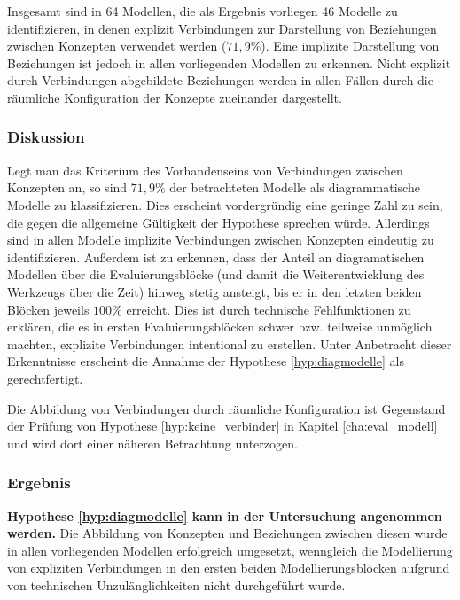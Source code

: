 Insgesamt sind in 64 Modellen, die als Ergebnis vorliegen 46 Modelle zu identifizieren, in denen explizit Verbindungen zur Darstellung von Beziehungen zwischen Konzepten verwendet werden ($71,9\%$). Eine implizite Darstellung von Beziehungen ist jedoch in allen vorliegenden Modellen zu erkennen. Nicht explizit durch Verbindungen abgebildete Beziehungen werden in allen Fällen durch die räumliche Konfiguration der Konzepte zueinander dargestellt.

\subsubsection{Diskussion} %

Legt man das Kriterium des Vorhandenseins von Verbindungen zwischen Konzepten an, so sind $71,9\%$ der betrachteten Modelle als diagrammatische Modelle zu klassifizieren. Dies erscheint vordergründig eine geringe Zahl zu sein, die gegen die allgemeine Gültigkeit der Hypothese sprechen würde. Allerdings sind in allen Modelle implizite Verbindungen zwischen Konzepten eindeutig zu identifizieren. Außerdem ist zu erkennen, dass der Anteil an diagramatischen Modellen über die Evaluierungsblöcke (und damit die Weiterentwicklung des Werkzeugs über die Zeit) hinweg stetig ansteigt, bis er in den letzten beiden Blöcken jeweils $100\%$ erreicht. Dies ist durch technische Fehlfunktionen zu erklären, die es in ersten Evaluierungsblöcken schwer bzw. teilweise unmöglich machten, explizite Verbindungen intentional zu erstellen. Unter Anbetracht dieser Erkenntnisse erscheint die Annahme der Hypothese \ref{hyp:diagmodelle} als gerechtfertigt.

Die Abbildung von Verbindungen durch räumliche Konfiguration ist Gegenstand der Prüfung von Hypothese \ref{hyp:keine_verbinder} in Kapitel \ref{cha:eval_modell} und wird dort einer näheren Betrachtung unterzogen.

\subsubsection{Ergebnis} %

\textbf{Hypothese \ref{hyp:diagmodelle} kann in der Untersuchung angenommen werden.} Die Abbildung von Konzepten und Beziehungen zwischen diesen wurde in allen vorliegenden Modellen erfolgreich umgesetzt, wenngleich die Modellierung von expliziten Verbindungen in den ersten beiden Modellierungsblöcken aufgrund von technischen Unzulänglichkeiten nicht durchgeführt wurde.


